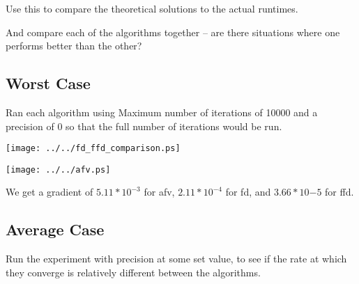 \documentclass{article}
\begin{document}
Use this to compare the theoretical solutions to the actual runtimes.

And compare each of the algorithms together -- are there situations where one performs better than the other?

\subsection{Worst Case}

Ran each algorithm using Maximum number of iterations of 10000 and a precision of 0 so that the full number of iterations would be run.


\begin{figure*}
    \begin{center}
        \texttt{[image: ../../fd\_ffd\_comparison.ps]}
    \end{center}
\end{figure*}
\begin{figure*}
    \begin{center}
        \texttt{[image: ../../afv.ps]}
    \end{center}
\end{figure*}
We get a gradient of $5.11*10^{-3}$ for afv, $2.11*10^{-4}$ for fd, and $3.66*10{-5}$ for ffd.

\subsection{Average Case}

Run the experiment with precision at some set value, to see if the rate at which they converge is relatively different between the algorithms.
\end{document}
